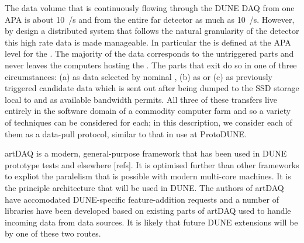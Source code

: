 The data volume that is continuously flowing through the DUNE
  DAQ from one APA is about \SI{10}{\GB/\s}
and from the entire far detector as much as \SI{10}{\TB/\s}.
However, by design a distributed system that follows the natural
granularity of the detector this high rate data is made manageable.
In particular the  is defined at the APA level for
the  .
The majority of the data corresponds to the untriggered parts and
never leaves the computers hosting the .
The parts that exit do so in one of three circumstances: (a) as data
selected by nominal , (b) as  or
(c) as previously triggered  candidate data which is
sent out after being dumped to the SSD storage local to
 and as available bandwidth permits. 
All three of these transfers live entirely in the software domain of a
commodity computer farm and so a variety of techniques can be
considered for each; in this description, we consider each of them as
a data-pull protocol, similar to that in use at ProtoDUNE.


artDAQ is a modern, general-purpose framework that has been used in
DUNE prototype tests and elsewhere [refs]. 
It is optimised further than other frameworks to expliot the
paralelism that is possible with modern multi-core machines. 
It is the principle architecture that will be used in DUNE.
The authors of artDAQ have accomodated DUNE-specific feature-addition
requests and a number of libraries have been developed based on
existing parts of artDAQ used to handle incoming data from data
sources. 
It is likely that future DUNE extensions will be by one of these two
routes.

